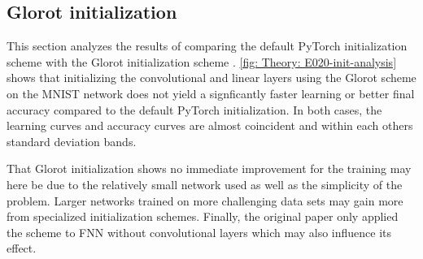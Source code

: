 \iffalse
\subsection{Glorot initialization}\label{sec: Experimental work: Glorot initialization}
This section analyzes the results of comparing the default PyTorch initialization scheme with the Glorot initialization scheme \cite{Glorot2010}. \autoref{fig: Theory: E020-init-analysis} shows that initializing the convolutional and linear layers using the Glorot scheme on the \gls{MNIST} network does not yield a signficantly faster learning or better final accuracy compared to the default PyTorch initialization.  In both cases, the learning curves and accuracy curves are almost coincident and within each others standard deviation bands.

That Glorot initialization shows no immediate improvement for the training may here be due to the relatively small network used as well as the simplicity of the problem. Larger networks trained on more challenging data sets may gain more from specialized initialization schemes. Finally, the original paper only applied the scheme to \gls{FNN} without convolutional layers \cite{Glorot2010} which may also influence its effect.


